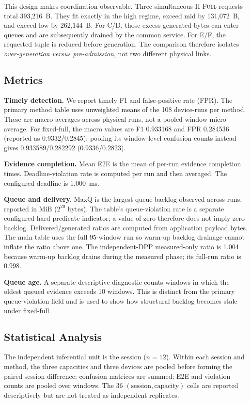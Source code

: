 \documentclass[10pt,journal]{IEEEtran}
\newcommand{\Hfull}{\textsc{H-Full}}
\begin{document}
This design makes coordination observable. Three simultaneous \Hfull{} requests total 393,216~B. They fit exactly in the high regime, exceed mid by 131,072~B, and exceed low by 262,144~B. For C/D, those excess generated bytes can enter queues and are subsequently drained by the common service. For E/F, the requested tuple is reduced before generation. The comparison therefore isolates \emph{over-generation versus pre-admission}, not two different physical links.

\subsection{Metrics}
\textbf{Timely detection.} We report timely F1 and false-positive rate (FPR). The primary method table uses unweighted means of the 108 device-runs per method. These are macro averages across physical runs, not a pooled-window micro average. For fixed-full, the macro values are F1 0.933168 and FPR 0.284536 (reported as 0.9332/0.2845); pooling its window-level confusion counts instead gives 0.933589/0.282292 (0.9336/0.2823).

\textbf{Evidence completion.} Mean E2E is the mean of per-run evidence completion times. Deadline-violation rate is computed per run and then averaged. The configured deadline is 1,000~ms.

\textbf{Queue and delivery.} MaxQ is the largest queue backlog observed across runs, reported in MiB ($2^{20}$ bytes). The table's queue-violation rate is a separate configured hard-predicate indicator; a value of zero therefore does not imply zero backlog. Delivered/generated ratios are computed from application payload bytes. The main table uses the full 95-window run so warm-up backlog drainage cannot inflate the ratio above one. The independent-DPP measured-only ratio is 1.004 because warm-up backlog drains during the measured phase; its full-run ratio is 0.998.

\textbf{Queue age.} A separate descriptive diagnostic counts windows in which the oldest queued evidence exceeds 10 windows. This is distinct from the primary queue-violation field and is used to show how structural backlog becomes stale under fixed-full.

\subsection{Statistical Analysis}
The independent inferential unit is the session ($n=12$). Within each session and method, the three capacities and three devices are pooled before forming the paired session difference: confusion matrices are summed; E2E and violation counts are pooled over windows. The 36 $(\text{session},\text{capacity})$ cells are reported descriptively but are not treated as independent replicates.
\end{document}
